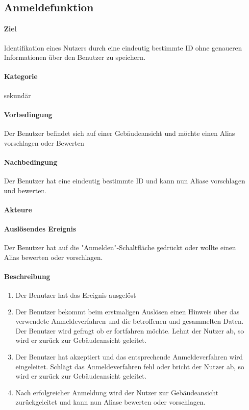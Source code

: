\subsection{Anmeldefunktion}
\label{Anmeldefunktion}
\paragraph{Ziel}
Identifikation eines Nutzers durch eine eindeutig bestimmte ID ohne genaueren Informationen über den Benutzer zu speichern.
\paragraph{Kategorie}
sekundär
\paragraph{Vorbedingung}
Der Benutzer befindet sich auf einer Gebäudeansicht und möchte einen Alias vorschlagen oder Bewerten
\paragraph{Nachbedingung}
Der Benutzer hat eine eindeutig bestimmte ID und kann nun Aliase vorschlagen und bewerten.
\paragraph{Akteure}

\paragraph{Auslösendes Ereignis}
Der Benutzer hat auf die "Anmelden"-Schaltfläche gedrückt oder wollte einen Alias bewerten oder vorschlagen.
\paragraph{Beschreibung}
\begin{enumerate}
    \item Der Benutzer hat das Ereignis ausgelöst
    \item Der Benutzer bekommt beim erstmaligen Auslösen einen Hinweis über das verwendete Anmeldeverfahren und die betroffenen und gesammelten Daten.
          Der Benutzer wird gefragt ob er fortfahren möchte.
          \subtitem Lehnt der Nutzer ab, so wird er zurück zur Gebäudeansicht geleitet.
    \item Der Benutzer hat akzeptiert und das entsprechende Anmeldeverfahren wird eingeleitet.
          \subitem Schlägt das Anmeldeverfahren fehl oder bricht der Nutzer ab, so wird er zurück zur Gebäudeansicht geleitet.
    \item Nach erfolgreicher Anmeldung wird der Nutzer zur Gebäudeansicht zurückgeleitet und kann nun Aliase bewerten oder vorschlagen.
\end{enumerate}